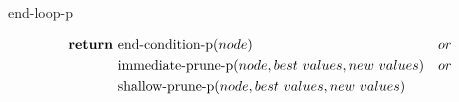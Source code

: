 \begin{algorithm}[H]
\caption{end-loop-p}\label{alg:end-loop-p}
\begin{algorithmic}
	\vspace{-1em}
	\begin{align*}
		\text{\Return} &\text{end-condition-p}(node)                              &or\\
		               &\text{immediate-prune-p}(node, best\ values, new\ values) &or\\
		               &\text{shallow-prune-p}(node, best\ values, new\ values)   &\\
		\end{align*}
	\vspace{-4em}
	\EndFunction
\end{algorithmic}
\end{algorithm}
